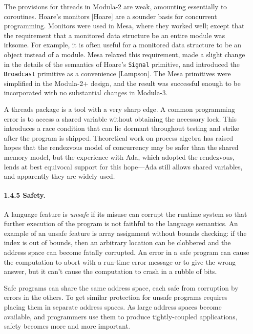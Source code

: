 \documentclass[10pt]{article}
\begin{document}
The provisions for threads in Modula-2 are weak, amounting essentially to
coroutines.  Hoare's monitors [Hoare] are a sounder basis for concurrent
programming.  Monitors were used in Mesa, where they worked well; except that
the requirement that a monitored data structure be an entire module was
irksome.  For example, it is often useful for a monitored data structure to be
an object instead of a module.  Mesa relaxed this requirement, made a slight
change in the details of the semantics of Hoare's \verb|Signal| primitive, and
introduced the \verb|Broadcast| primitive as a convenience [Lampson].  The Mesa
primitives were simplified in the Modula-2+ design, and the result was
successful enough to be incorporated with no substantial changes in Modula-3.

A threads package is a tool with a very sharp edge.  A common programming
error is to access a shared variable without obtaining the necessary lock.
This introduces a race condition that can lie dormant throughout testing and
strike after the program is shipped.  Theoretical work on process algebra has
raised hopes that the rendezvous model of concurrency may be safer than the
shared memory model, but the experience with Ada, which adopted the
rendezvous, lends at best equivocal support for this hope---Ada still allows
shared variables, and apparently they are widely used.

\paragraph{1.4.5 Safety.}

A language feature is \emph{unsafe} if its misuse can corrupt the runtime
system so that further execution of the program is not faithful to the
language semantics.  An example of an unsafe feature is array assignment
without bounds checking: if the index is out of bounds, then an arbitrary
location can be clobbered and the address space can become fatally corrupted.
An error in a safe program can cause the computation to abort with a run-time
error message or to give the wrong answer, but it can't cause the computation
to crash in a rubble of bits.

Safe programs can share the same address space, each safe from corruption by
errors in the others.  To get similar protection for unsafe programs requires
placing them in separate address spaces.  As large address spaces become
available, and programmers use them to produce tightly-coupled applications,
safety becomes more and more important.
\end{document}
